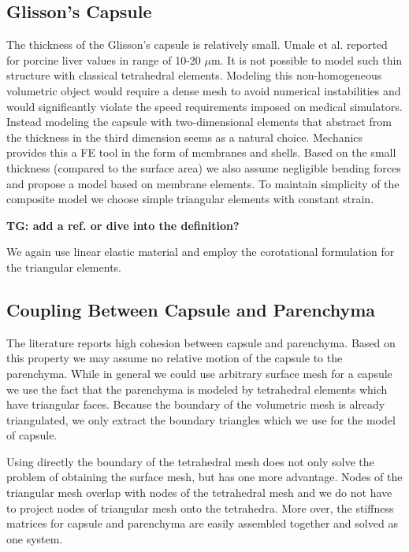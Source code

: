 \documentclass{llncs}
\newcommand{\TG}[1]{{\color{blue}\textbf{TG: #1}}}
\begin{document}

\subsection{Glisson's Capsule} %

The thickness of the Glisson's capsule is relatively small. Umale et al.
\cite{Umale2011} reported for porcine liver values in range of 10-20
$\mu$m.
It is not possible to model such thin structure with classical tetrahedral
elements. Modeling this non-homogeneous volumetric object would require a
dense mesh to avoid numerical instabilities and would significantly
violate the speed requirements imposed on medical simulators.
Instead modeling the capsule with two-dimensional elements that abstract from the
thickness in the third dimension seems
as a natural choice. Mechanics provides this a FE tool in the form of membranes
and shells. Based on the small thickness (compared to the surface area) we also
assume negligible bending forces and propose a model based on membrane
elements. 
To maintain simplicity of the composite model we choose simple triangular
elements with constant strain.

\TG{add a ref. or dive into the definition? \cite{Felippa2003}}

We again use linear elastic material and employ the corotational formulation
for the triangular elements.


\subsection{Coupling Between Capsule and Parenchyma} %

The literature reports high cohesion between capsule and parenchyma.
Based on this
property we may assume no relative motion of the capsule to the parenchyma.
While in general we could use arbitrary surface mesh for a capsule we use
the fact that the parenchyma is modeled by tetrahedral elements which have
triangular faces. Because the boundary of the volumetric mesh is already
triangulated, we only extract the boundary triangles which we use for the
model of capsule.

Using directly the boundary of the tetrahedral mesh does not only solve the
problem of obtaining the surface mesh, but has one more advantage. Nodes
of the triangular mesh overlap with nodes of the tetrahedral mesh and we do
not have to project nodes of triangular mesh onto the tetrahedra. More over,
the stiffness matrices for capsule and parenchyma are easily assembled
together and solved as one system.
\end{document}
